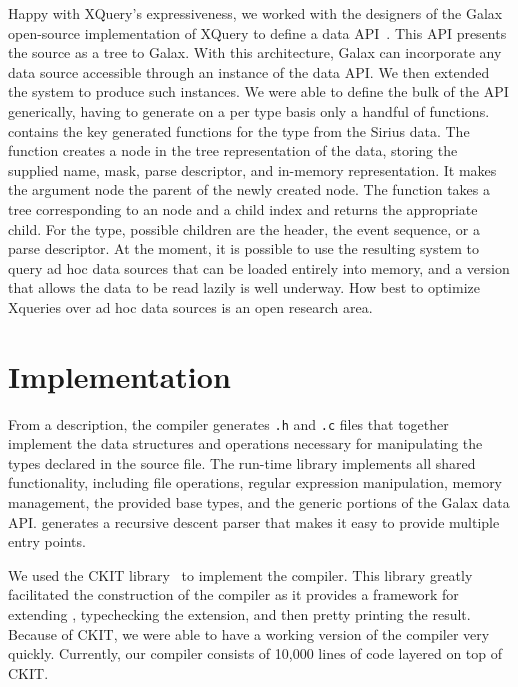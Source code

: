 \documentclass[times]{acm-sigplan}
\newcommand{\dibbler}{Sirius}
\begin{document}
Happy with XQuery's expressiveness, we worked with the designers of the Galax~\cite{galax} open-source implementation of XQuery to define a data API~\cite{galaxmanual}. 
This API presents the source as a tree to Galax. With this architecture, Galax can incorporate any data source accessible through an instance of the data API.  We then extended the \pads{} system to produce such instances.  We were able to define the bulk of the API generically, having to generate on a per type basis only a handful of functions. 
 contains the key generated functions for the  type from the \dibbler{} data.    The   function creates a node in the tree representation of the data, storing the supplied name, mask, parse descriptor, and in-memory representation.  It makes the argument node the parent of the newly created node.
The  function takes a tree
corresponding to an  node and a child index and returns the appropriate child.  For the  type, possible children are the header, the event sequence, or a parse descriptor. 
At the moment, it is possible to use the resulting system to query ad hoc data sources that can be loaded entirely into memory, and a version that allows the data to be read lazily is well underway.
How best to optimize Xqueries over ad hoc data sources is an open research area.

\section{Implementation}
From a \pads{} description, the \pads{} compiler generates \texttt{.h} and
\texttt{.c} files that together implement the data structures and operations 
necessary for manipulating the types declared in the source file.  The
\pads{} run-time library implements all shared functionality, including file operations, regular expression manipulation, memory management, the provided base types, and the generic portions of the Galax data API.  \pads{} generates a recursive descent parser that makes it easy to provide multiple entry points.

We used the CKIT library~\cite{ckit} to implement the \pads{} compiler.
This library greatly facilitated the construction of the compiler as it
provides a framework for extending \C{}, typechecking the extension, and then pretty printing the result.  Because of CKIT, we were able to have a working version of the \pads{} compiler very quickly.
Currently, our compiler consists of 10,000 lines of \smlnj{} code layered on top of CKIT.
\end{document}
